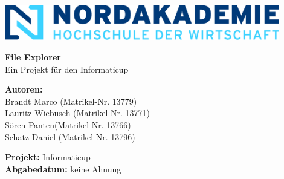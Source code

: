 \begin{titlepage}
	\begin{center}

		\includegraphics[width=0.9\textwidth]{images/Nordakademie_Logo.png}
		\vspace{1cm}

		\huge
		\textbf{File Explorer}\\
		Ein Projekt für den Informaticup
		\vspace{0.5cm}

		\large

		\vspace{1.5cm}
		\textbf{Autoren:}\\
		Brandt Marco (Matrikel-Nr. 13779)\\
		Lauritz Wiebusch (Matrikel-Nr. 13771)\\
		Sören Panten(Matrikel-Nr. 13766)\\
		Schatz Daniel (Matrikel-Nr. 13796)

		\vspace{1cm}
		\textbf{Projekt:} Informaticup\\
		\textbf{Abgabedatum:} keine Ahnung

		\vfill

	\end{center}

\end{titlepage}
